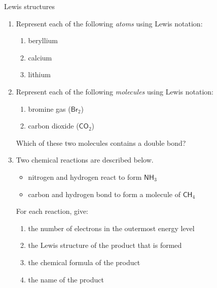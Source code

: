     \noindent
\label{m38701*secfhsst!!!underscore!!!id327}
            \begin{exercises}{Lewis structures}
            \nopagebreak
      \label{m38701*id140889}\begin{enumerate}[noitemsep, label=\textbf{\arabic*}. ] 
            \label{m38701*uid23}\item Represent each of the following \textsl{atoms} using Lewis notation:
\label{m38701*id140910}\begin{enumerate}[noitemsep, label=\textbf{\alph*}. ] 
            \label{m38701*uid24}\item beryllium
\label{m38701*uid25}\item calcium
\label{m38701*uid26}\item lithium
\end{enumerate}
                \label{m38701*uid27}\item Represent each of the following \textsl{molecules} using Lewis notation:
\label{m38701*id140969}\begin{enumerate}[noitemsep, label=\textbf{\alph*}. ] 
            \label{m38701*uid28}\item bromine gas ($\mathsf{Br}{}_{2}$)
\label{m38701*uid29}\item carbon dioxide ($\mathsf{CO}{}_{2}$)
\end{enumerate}
Which of these two molecules contains a double bond?\newline
\label{m38701*uid31}\item Two chemical reactions are described below.
\label{m38701*id141048}\begin{itemize}[noitemsep]
            \label{m38701*uid32}\item nitrogen and hydrogen react to form $\mathsf{NH}_{3}$\label{m38701*uid33}
\item carbon and hydrogen bond to form a molecule of $\mathsf{CH}_{4}$\end{itemize}
For each reaction, give:
\label{m38701*id141106}\begin{enumerate}[noitemsep, label=\textbf{\alph*}. ] 
\item the number of electrons in the outermost energy level
\label{m38701*uid35}\item the Lewis structure of the product that is formed
\label{m38701*uid36}\item the chemical formula of the product
\label{m38701*uid37}\item the name of the product
\end{enumerate}

\end{enumerate}
\end{exercises}
